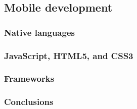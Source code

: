 \subsection{Mobile development}

\subsubsection{Native languages}
\subsubsection{JavaScript, HTML5, and CSS3}
\subsubsection{Frameworks}
\subsubsection{Conclusions}